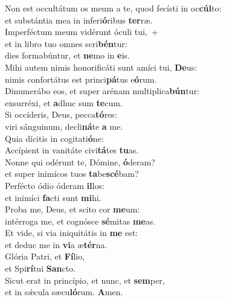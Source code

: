 \evenverse Non est occultátum os meum a te, quod fecísti in oc\textbf{cúl}to:~\*\\
\evenverse et substántia mea in inferi\textbf{ó}ribus \textbf{ter}ræ.\\
\oddverse Imperféctum meum vidérunt óculi tui,~+\\
\oddverse  et in libro tuo omnes scri\textbf{bén}tur:~\*\\
\oddverse dies formabúntur, et \textbf{ne}mo in \textbf{e}is.\\
\evenverse Mihi autem nimis honorificáti sunt amíci tui, \textbf{De}us:~\*\\
\evenverse nimis confortátus est princi\textbf{pá}tus e\textbf{ó}rum.\\
\oddverse Dinumerábo eos, et super arénam multiplica\textbf{bún}tur:~\*\\
\oddverse exsurréxi, et \textbf{a}dhuc sum \textbf{te}cum.\\
\evenverse Si occíderis, Deus, pecca\textbf{tó}res:~\*\\
\evenverse viri sánguinum, decli\textbf{ná}te \textbf{a} me.\\
\oddverse Quia dícitis in cogitati\textbf{ó}ne:~\*\\
\oddverse Accípient in vanitáte civi\textbf{tá}tes \textbf{tu}as.\\
\evenverse Nonne qui odérunt te, Dómine, \textbf{ó}deram?~\*\\
\evenverse et super inimícos tuos \textbf{ta}be\textbf{scé}bam?\\
\oddverse Perfécto ódio óderam \textbf{il}los:~\*\\
\oddverse et inimíci \textbf{fa}cti sunt \textbf{mi}hi.\\
\evenverse Proba me, Deus, et scito cor \textbf{me}um:~\*\\
\evenverse intérroga me, et cognósce \textbf{sé}mitas \textbf{me}as.\\
\oddverse Et vide, si via iniquitátis in \textbf{me} est:~\*\\
\oddverse et deduc me in \textbf{vi}a æ\textbf{tér}na.\\
\evenverse Glória Patri, et \textbf{Fí}lio,~\*\\
\evenverse et Spi\textbf{rí}tui \textbf{San}cto.\\
\oddverse Sicut erat in princípio, et nunc, et \textbf{sem}per,~\*\\
\oddverse et in sǽcula sæcu\textbf{ló}rum. \textbf{A}men.\\
